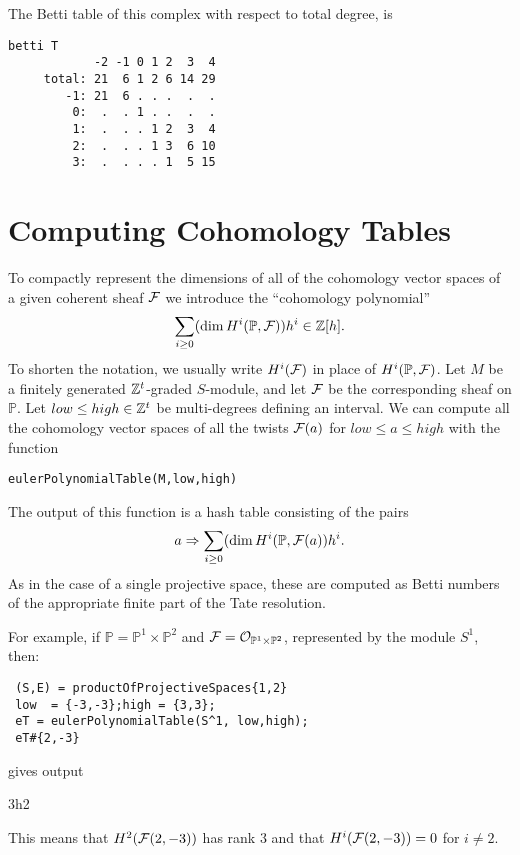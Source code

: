 \documentclass[twoside,12pt, leqno]{amsart}
\def\PP{{\mathbb P}}
\begin{document}
The Betti table of this complex with respect to total degree, is
\goodbreak
{\small \begin{verbatim}
betti T
            -2 -1 0 1 2  3  4
     total: 21  6 1 2 6 14 29
        -1: 21  6 . . .  .  .
         0:  .  . 1 . .  .  .
         1:  .  . . 1 2  3  4
         2:  .  . . 1 3  6 10
         3:  .  . . . 1  5 15
\end{verbatim}}
\noindent

\section{Computing Cohomology Tables}\label{sec:cohom tables}
To compactly represent the dimensions of all of the cohomology vector spaces of a given coherent sheaf ${\mathcal F}$ we introduce the ``cohomology polynomial''
$$
\sum_{i\geq 0} (\dim H^i(\PP, \sF))h^i\in \ZZ[h].
$$
To shorten the notation, we usually write $H^i({\mathcal F})$ in place of $H^i(\PP, \sF)$.
Let $M$ be a finitely generated ${\mathbb Z}^t$-graded $S$-module, and let ${\mathcal F}$ be the 
corresponding sheaf on $\PP$. Let
$low\leq high\in {\mathbb Z}^t$ be multi-degrees defining an interval. We can compute
all the cohomology vector spaces of all the twists ${\mathcal F}(a)$ for $low\leq a\leq high$ with the function 
{\small \begin{verbatim}
eulerPolynomialTable(M,low,high)
\end{verbatim}}
The output of this function is a hash table consisting of the pairs
$$ 
a \Rightarrow \sum_{i\geq 0} (\dim H^i(\PP, \sF(a))h^i.
$$
As in the case of a single projective space, these are computed as Betti numbers of the appropriate finite  part of the Tate resolution.

For example,  if $\PP=\PP^1\times \PP^2$ and   $\sF = \sO_{\PP^1\times \PP^2}$, represented by the module
$S^1$, then:
{\small \begin{verbatim}
 (S,E) = productOfProjectiveSpaces{1,2}
 low  = {-3,-3};high = {3,3};
 eT = eulerPolynomialTable(S^1, low,high);
 eT#{2,-3}
\end{verbatim}}
gives output
\begin{verb}
3h2 
\end{verb}
This means that $H^2({\mathcal F}(2,-3))$ has rank $3$ and that $H^i({\mathcal F}(2,-3)) = 0$ for $i\ne 2$.
\end{document}
